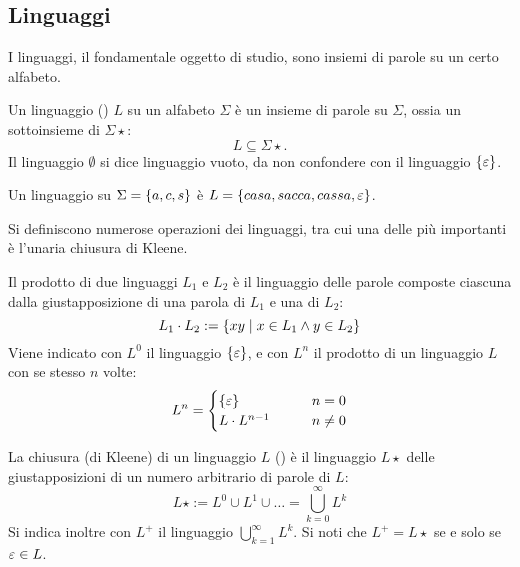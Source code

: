 \subsection*{Linguaggi}
I linguaggi, il fondamentale oggetto di studio, sono insiemi di parole su un certo alfabeto.
\begin{defin}[linguaggio]
	Un linguaggio () $L$ su un alfabeto $\Sigma$ è un insieme di parole su $\Sigma$, ossia un sottoinsieme di $\Sigma\star$:
	\begin{equation*}
		L\subseteq\Sigma\star.
	\end{equation*}
	Il linguaggio $\emptyset$ si dice linguaggio vuoto, da non confondere con il linguaggio $\left\{ \varepsilon \right\}$.
\end{defin}
\begin{examp}
	Un linguaggio su $\Sigma=\left\{ a,c,s \right\}$ è $L=\left\{ casa, sacca, cassa, \varepsilon \right\}$.
\end{examp}
Si definiscono numerose operazioni dei linguaggi, tra cui una delle più importanti è l'unaria chiusura di Kleene.
\begin{defin}
	Il prodotto di due linguaggi $L_1$ e $L_2$ è il linguaggio delle parole composte ciascuna dalla giustapposizione di una parola di $L_1$ e una di $L_2$:
	\begin{equation*}
		L_1\cdot L_2 := \left\{ xy\mid x\in L_1 \land y\in L_2 \right\}
	\end{equation*}
	Viene indicato con $L^0$ il linguaggio $\left\{ \varepsilon \right\}$, e con $L^n$ il prodotto di un linguaggio $L$ con se stesso $n$ volte:
	\begin{equation*}
		L^n=\begin{cases}
			\left\{ \varepsilon \right\} \qquad & n=0    \\
			L\cdot L^{n-1}\qquad    & n\neq0
		\end{cases}
	\end{equation*}
\end{defin}
\begin{defin}
	La chiusura (di Kleene) di un linguaggio $L$ () è il linguaggio $L\star$ delle giustapposizioni di un numero arbitrario di parole di $L$:
	\begin{equation*}
		L\star := L^0\cup L^1\cup\dots=\bigcup_{k=0}^\infty L^k
	\end{equation*}
	Si indica inoltre con $L^+$ il linguaggio $\bigcup_{k=1}^\infty L^k$. Si noti che $L^+=L\star$ se e solo se $\varepsilon\in L$.
\end{defin}

